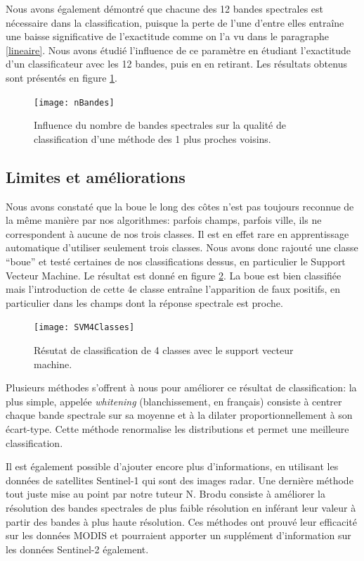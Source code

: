 \documentclass[a4paper,10pt]{article}
\begin{document}
Nous avons également démontré que chacune des 12 bandes spectrales est nécessaire dans la classification, puisque la perte de l'une d'entre elles entraîne une baisse significative de l'exactitude comme on l'a vu dans le paragraphe \ref{lineaire}. Nous avons étudié l'influence de ce paramètre en étudiant l'exactitude d'un classificateur avec les 12 bandes, puis en en retirant. Les résultats obtenus sont présentés en figure \ref{fig:nBandes}.

\begin{figure}
  \centering
    \texttt{[image: nBandes]}
  \caption{Influence du nombre de bandes spectrales sur la qualité de classification d'une méthode des 1 plus proches voisins.}
  \label{fig:nBandes}
\end{figure}

\subsection{Limites et améliorations}
Nous avons constaté que la boue le long des côtes n'est pas toujours reconnue de la même manière par nos algorithmes: parfois champs, parfois ville, ils ne correspondent à aucune de nos trois classes. Il est en effet rare en apprentissage automatique d'utiliser seulement trois classes. Nous avons donc rajouté une classe ``boue'' et testé certaines de nos classifications dessus, en particulier le Support Vecteur Machine. Le résultat est donné en figure \ref{fig:SVM4Cl}. La boue est bien classifiée mais l'introduction de cette 4e classe entraîne l'apparition de faux positifs, en particulier dans les champs dont la réponse spectrale est proche.
\begin{figure}
  \centering
    \texttt{[image: SVM4Classes]}
  \caption{Résutat de classification de 4 classes avec le support vecteur machine.}
  \label{fig:SVM4Cl}
\end{figure}

Plusieurs méthodes s'offrent à nous pour améliorer ce résultat de classification: la plus simple, appelée \textit{whitening} (blanchissement, en français) consiste à centrer chaque bande spectrale sur sa moyenne et à la dilater proportionnellement à son écart-type. Cette méthode renormalise les distributions et permet une meilleure classification.

Il est également possible d'ajouter encore plus d'informations, en utilisant les données de satellites Sentinel-1 qui sont des images radar. Une dernière méthode tout juste mise au point par notre tuteur N. Brodu consiste à améliorer la résolution des bandes spectrales de plus faible résolution en inférant leur valeur à partir des bandes à plus haute résolution. Ces méthodes ont prouvé leur efficacité sur les données MODIS et pourraient apporter un supplément d'information sur les données Sentinel-2 également.
\end{document}
